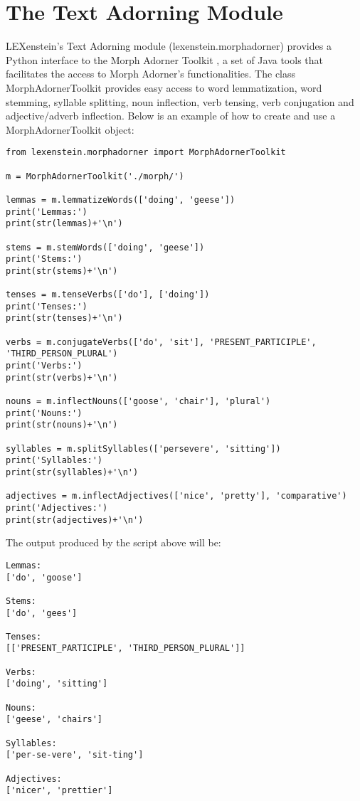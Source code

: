 \chapter{The Text Adorning Module}
\label{adorning}

LEXenstein's Text Adorning module (lexenstein.morphadorner) provides a Python interface to the Morph Adorner Toolkit \cite{Paetzold15mat}, a set of Java tools that facilitates the access to Morph Adorner's functionalities. The class MorphAdornerToolkit provides easy access to word lemmatization, word stemming, syllable splitting, noun inflection, verb tensing, verb conjugation and adjective/adverb inflection. Below is an example of how to create and use a MorphAdornerToolkit object:

\begin{lstlisting}
from lexenstein.morphadorner import MorphAdornerToolkit

m = MorphAdornerToolkit('./morph/')

lemmas = m.lemmatizeWords(['doing', 'geese'])
print('Lemmas:')
print(str(lemmas)+'\n')

stems = m.stemWords(['doing', 'geese'])
print('Stems:')
print(str(stems)+'\n')

tenses = m.tenseVerbs(['do'], ['doing'])
print('Tenses:')
print(str(tenses)+'\n')

verbs = m.conjugateVerbs(['do', 'sit'], 'PRESENT_PARTICIPLE', 'THIRD_PERSON_PLURAL')
print('Verbs:')
print(str(verbs)+'\n')

nouns = m.inflectNouns(['goose', 'chair'], 'plural')
print('Nouns:')
print(str(nouns)+'\n')

syllables = m.splitSyllables(['persevere', 'sitting'])
print('Syllables:')
print(str(syllables)+'\n')

adjectives = m.inflectAdjectives(['nice', 'pretty'], 'comparative')
print('Adjectives:')
print(str(adjectives)+'\n')
\end{lstlisting}

The output produced by the script above will be:

\begin{lstlisting}
Lemmas:
['do', 'goose']

Stems:
['do', 'gees']

Tenses:
[['PRESENT_PARTICIPLE', 'THIRD_PERSON_PLURAL']]

Verbs:
['doing', 'sitting']

Nouns:
['geese', 'chairs']

Syllables:
['per-se-vere', 'sit-ting']

Adjectives:
['nicer', 'prettier']
\end{lstlisting}